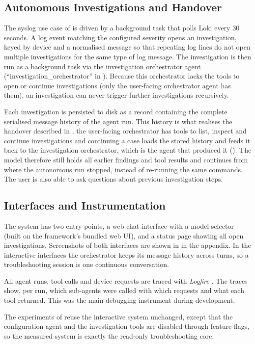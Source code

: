 \newpage
\subsection{Autonomous Investigations and Handover}
\label{sec:impl-investigations}
The syslog use case of  is driven by a background task that polls Loki
every 30 seconds. A log event matching the configured severity opens an investigation, keyed
by device and a normalised message so that repeating log lines do not open multiple investigations for the same type of log message.
The investigation is then run as a background task via the investigation orchestrator agent (\enquote{investigation\_orchestrator} in ). Because this orchestrator lacks the tools to open or
continue investigations (only the user-facing orchestrator agent has them), an investigation can never trigger further investigations recursively.

Each investigation is persisted to disk as a record containing the complete
serialised message history of the agent run. This history is what realises the handover described in
, the user-facing orchestrator has tools to list, inspect and continue
investigations and continuing a case loads the stored history and feeds it back to the investigation orchestrator, which
is the agent that produced it ().
The model therefore still holds all earlier findings and tool results and continues from
where the autonomous run stopped, instead of re-running the same commands. The user is also able to ask questions about previous investigation steps.

\subsection{Interfaces and Instrumentation}
\label{sec:impl-interfaces}
The system has two entry points, a web chat interface with a model
selector (built on the framework's bundled web UI), and a status page showing all open investigations.
Screenshots of both interfaces are shown in  in the
appendix. In
the interactive interfaces the orchestrator keeps its message history across turns, so a troubleshooting
session is one continuous conversation.

All agent runs, tool calls and device requests are traced with \emph{Logfire} \parencite{logfire}. The
traces show, per run, which sub-agents were called with which requests and what each tool returned. This
was the main debugging instrument during development.

The experiments of  reuse the interactive system unchanged, except that the
configuration agent and the investigation tools are disabled through feature flags, so the measured system
is exactly the read-only troubleshooting core.

